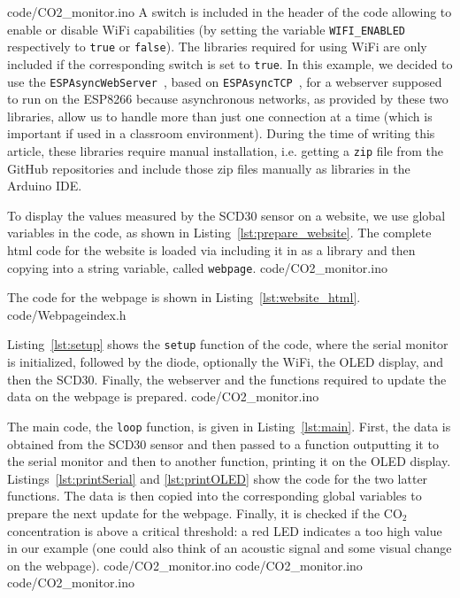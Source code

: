 \documentclass[12pt,a4paper]{article}
\newcommand{\coo}{\ensuremath{\mathrm{CO_2}~}}
\begin{document}
%
{code/CO2_monitor.ino} 
A switch is included in the header of the code allowing to enable or disable WiFi capabilities (by setting the variable \texttt{WIFI\_ENABLED} respectively to \texttt{true} or \texttt{false}). The libraries required for using WiFi are only included if the corresponding switch is set to \texttt{true}. In this example, we decided to use the \texttt{ESPAsyncWebServer}~\cite{MENODEV2020B}, based on \texttt{ESPAsyncTCP}~\cite{MENODEV2020A}, for a webserver supposed to run on the ESP8266 because asynchronous networks, as provided by these two libraries, allow us to handle more than just one connection at a time (which is important if used in a classroom environment). During the time of writing this article, these libraries require manual installation, i.e. getting a \texttt{zip} file from the GitHub repositories and include those zip files manually as libraries in the Arduino IDE.

To display the values measured by the SCD30 sensor on a website, we use global variables in the code, as shown in Listing~\ref{lst:prepare_website}. The complete html code for the website is loaded via including it in as a library and then copying into a string variable, called \texttt{webpage}.
%
{code/CO2_monitor.ino}

The code for the webpage is shown in Listing~\ref{lst:website_html}.
%
{code/Webpageindex.h}


Listing~\ref{lst:setup} shows the \texttt{setup} function of the code, where the serial monitor is initialized, followed by the diode, optionally the WiFi, the OLED display, and then the SCD30. Finally, the webserver and the functions required to update the data on the webpage is prepared.
%
{code/CO2_monitor.ino}

The main code, the \texttt{loop} function, is given in Listing~\ref{lst:main}. First, the data is obtained from the SCD30 sensor and then passed to a function outputting it to the serial monitor and then to another function, printing it on the OLED display. Listings~\ref{lst:printSerial} and \ref{lst:printOLED} show the code for the two latter functions. The data is then copied into the corresponding global variables to prepare the next update for the webpage. Finally, it is checked if the \coo concentration is above a critical threshold: a red LED indicates a too high value in our example (one could also think of an acoustic signal and some visual change on the webpage).
%
{code/CO2_monitor.ino} 
%
{code/CO2_monitor.ino} 
%
{code/CO2_monitor.ino} 
\end{document}
